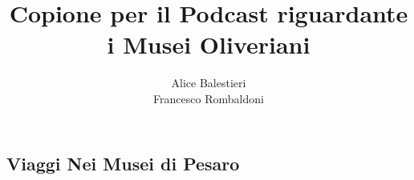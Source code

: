 \documentclass[hidelinks,12pt,a4paper]{article}
\begin{document}
	\begin{flushleft}
		
		\title{\textbf{Copione per il Podcast riguardante i Musei Oliveriani}}
		\author{Alice Balestieri\\Francesco Rombaldoni}
		\date{}
		
		\maketitle
		
		\setcounter{page}{1}
		\newpage
		
		\tableofcontents
		\newpage
		
		
		\section{Viaggi Nei Musei di Pesaro}

\end{flushleft}
\end{document}
